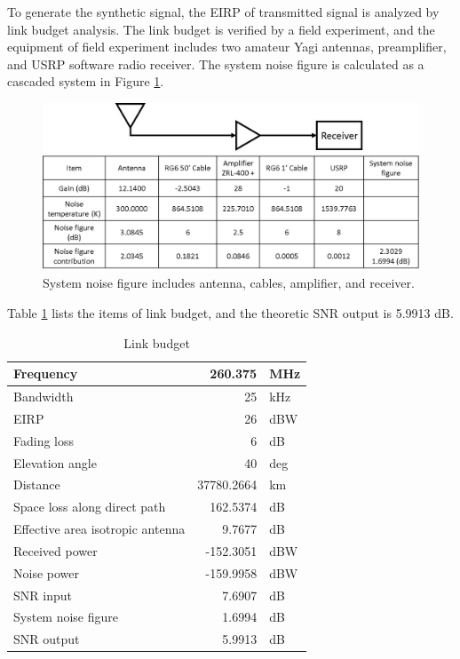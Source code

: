 \documentclass[draftcls,onecolumn]{IEEEtran}  %
\begin{document}
To generate the synthetic signal, the EIRP of transmitted signal is analyzed by link budget analysis. The link budget is verified by a field experiment, and the equipment of field experiment includes two amateur Yagi antennas, preamplifier, and USRP software radio receiver. The system noise figure is calculated as a cascaded system in Figure \ref{fig:link_budget}.
\begin{figure}[h]
	\centering
	\includegraphics[width=\textwidth]{pdf/Link_budget.jpg}
	\caption{System noise figure includes antenna, cables, amplifier, and receiver.}
	\centering
	\label{fig:link_budget}
\end{figure}
Table \ref{table: link_budget} lists the items of link budget, and the theoretic SNR output is 5.9913 dB.
\begin{table}[ht]
\centering
\caption{Link budget}
\begin{tabular}{lrl}
\hline
Frequency                        & 260.375    & MHz \\ \hline
Bandwidth                        & 25         & kHz \\ \hline
EIRP                             & 26         & dBW \\ \hline
Fading loss                      & 6          & dB  \\ \hline
Elevation angle                  & 40         & deg \\ \hline
Distance                         & 37780.2664 & km  \\ \hline
Space loss along direct path     & 162.5374   & dB  \\ \hline
Effective area isotropic antenna & 9.7677     & dB  \\ \hline
Received power                   & -152.3051  & dBW \\ \hline
Noise power                      & -159.9958  & dBW \\ \hline
SNR input                        & 7.6907     & dB  \\ \hline
System noise figure              & 1.6994     & dB  \\ \hline
SNR output                       & 5.9913     & dB  \\ \hline
\end{tabular}
\label{table: link_budget}
\end{table}
\end{document}
